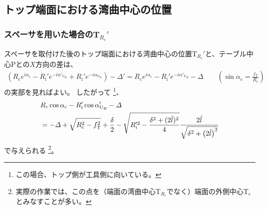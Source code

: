 


\subsection{トップ端面における湾曲中心の位置}


\subsubsection{スペーサを用いた場合のT\texorpdfstring{$_{R_\mathrm c}'$}{Rc'}}
スペーサを取付けた後のトップ端面における湾曲中心の位置T$_{R_\mathrm c}'$と、テーブル中心Pとの$X$方向の差は、
\begin{align*}
  \left(
    R_\mathrm ce^{i\alpha_\mathrm c}
    -R_\mathrm i'e^{-i\alpha'_{\mathrm U_\mathrm B}}
    +R_\mathrm i'e^{-i\alpha_{\mathrm U_\mathrm B}}
  \right)
  -\varDelta'
  = R_\mathrm ce^{i\alpha_\mathrm c}-R_\mathrm i'e^{-i\alpha'_{\mathrm U_\mathrm B}}-\varDelta \qquad
    \left(\sin\alpha_\mathrm c = \frac{f_\mathrm T}{R_\mathrm c}\right)
\end{align*}
の実部を見ればよい。
したがって
\footnote{この場合、トップ側が工具側に向いている。}、
\begin{align}
  \notag
  &  R_\mathrm c\cos\alpha_\mathrm c-R_\mathrm i'\cos\alpha'_{\mathrm U_\mathrm B}-\varDelta\\
  &= -\varDelta+\sqrt{R_\mathrm c^2-f_\mathrm T^2}+\frac\delta2
     -\sqrt{R_\mathrm i'^2-\frac{\delta^2+(2\bar l)^2}4}
      \frac{2\bar l}{\sqrt{\delta^2+\left(2\bar l\right)^2}}
     \label{eq:spacerTRc}
\end{align}
で与えられる
\footnote{実際の作業では、この点を（端面の湾曲中心T$_{R_\mathrm c}\!$でなく）端面の外側中心T$_\mathrm c$とみなすことが多い。}。


